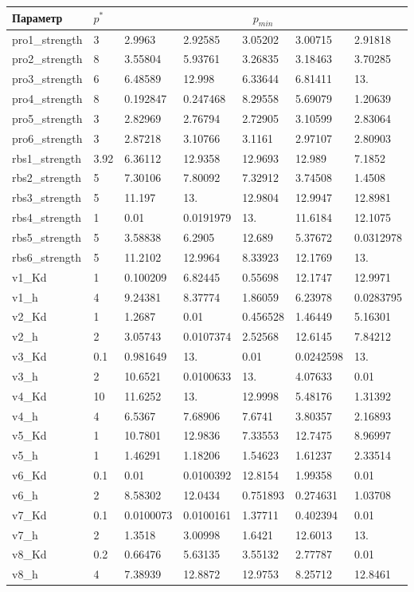 \begin{tabular}{l|l|lllll}
Параметр & $p^*$ & \multicolumn{5}{c}{$p_{min}$} \\ 
\hline
pro1\_strength & 3 & 2.9963 & 2.92585 & 3.05202 & 3.00715 & 2.91818 \\ 
pro2\_strength & 8 & 3.55804 & 5.93761 & 3.26835 & 3.18463 & 3.70285 \\ 
pro3\_strength & 6 & 6.48589 & 12.998 & 6.33644 & 6.81411 & 13. \\ 
pro4\_strength & 8 & 0.192847 & 0.247468 & 8.29558 & 5.69079 & 1.20639 \\ 
pro5\_strength & 3 & 2.82969 & 2.76794 & 2.72905 & 3.10599 & 2.83064 \\ 
pro6\_strength & 3 & 2.87218 & 3.10766 & 3.1161 & 2.97107 & 2.80903 \\ 
rbs1\_strength & 3.92 & 6.36112 & 12.9358 & 12.9693 & 12.989 & 7.1852 \\ 
rbs2\_strength & 5 & 7.30106 & 7.80092 & 7.32912 & 3.74508 & 1.4508 \\ 
rbs3\_strength & 5 & 11.197 & 13. & 12.9804 & 12.9947 & 12.8981 \\ 
rbs4\_strength & 1 & 0.01 & 0.0191979 & 13. & 11.6184 & 12.1075 \\ 
rbs5\_strength & 5 & 3.58838 & 6.2905 & 12.689 & 5.37672 & 0.0312978 \\ 
rbs6\_strength & 5 & 11.2102 & 12.9964 & 8.33923 & 12.1769 & 13. \\ 
v1\_Kd & 1 & 0.100209 & 6.82445 & 0.55698 & 12.1747 & 12.9971 \\ 
v1\_h & 4 & 9.24381 & 8.37774 & 1.86059 & 6.23978 & 0.0283795 \\ 
v2\_Kd & 1 & 1.2687 & 0.01 & 0.456528 & 1.46449 & 5.16301 \\ 
v2\_h & 2 & 3.05743 & 0.0107374 & 2.52568 & 12.6145 & 7.84212 \\ 
v3\_Kd & 0.1 & 0.981649 & 13. & 0.01 & 0.0242598 & 13. \\ 
v3\_h & 2 & 10.6521 & 0.0100633 & 13. & 4.07633 & 0.01 \\ 
v4\_Kd & 10 & 11.6252 & 13. & 12.9998 & 5.48176 & 1.31392 \\ 
v4\_h & 4 & 6.5367 & 7.68906 & 7.6741 & 3.80357 & 2.16893 \\ 
v5\_Kd & 1 & 10.7801 & 12.9836 & 7.33553 & 12.7475 & 8.96997 \\ 
v5\_h & 1 & 1.46291 & 1.18206 & 1.54623 & 1.61237 & 2.33514 \\ 
v6\_Kd & 0.1 & 0.01 & 0.0100392 & 12.8154 & 1.99358 & 0.01 \\ 
v6\_h & 2 & 8.58302 & 12.0434 & 0.751893 & 0.274631 & 1.03708 \\ 
v7\_Kd & 0.1 & 0.0100073 & 0.0100161 & 1.37711 & 0.402394 & 0.01 \\ 
v7\_h & 2 & 1.3518 & 3.00998 & 1.6421 & 12.6013 & 13. \\ 
v8\_Kd & 0.2 & 0.66476 & 5.63135 & 3.55132 & 2.77787 & 0.01 \\ 
v8\_h & 4 & 7.38939 & 12.8872 & 12.9753 & 8.25712 & 12.8461
\end{tabular}
